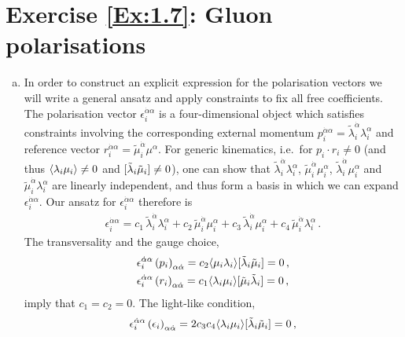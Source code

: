 
\section*{Exercise \ref{Ex:1.7}: Gluon polarisations}
\label{Sol:1.7}

\begin{enumerate}[a)]
\item In order to construct an explicit expression for the polarisation vectors we will write a general ansatz and apply constraints to fix all free coefficients. The polarisation vector $\epsilon^{\dot{\alpha}\alpha}_i$ is a four-dimensional object which satisfies constraints involving the corresponding external momentum $p_i^{\dot{\alpha} \alpha} = \tilde{\lambda}_i^{\dot{\alpha}} \lambda_i^{\alpha}$ and reference vector $r_i^{\dot{\alpha} \alpha} = \tilde{\mu}_i^{\dot{\alpha}} \mu^{\alpha}$. For generic kinematics, i.e.\ for $p_i \cdot r_i \neq 0$ (and thus $\langle \lambda_i \mu_i \rangle \neq 0$ and $[ \tilde{\lambda}_i \tilde{\mu}_i ]\neq 0$), one can show that $\tilde{\lambda}_i^{\dot{\alpha}} \lambda_i^{\alpha}$, $\tilde{\mu}_i^{\dot{\alpha}} \mu_i^{\alpha}$,
 $\tilde{\lambda}_i^{\dot{\alpha}} \mu_i^{\alpha}$ and $\tilde{\mu}_i^{\dot{\alpha}} \lambda_i^{\alpha}$ are linearly independent, and thus form a basis in which we can expand $\epsilon^{\dot{\alpha}\alpha}_i$. Our ansatz for $\epsilon^{\dot{\alpha}\alpha}_i$ therefore is
\begin{align}
\epsilon^{\dot{\alpha}\alpha}_i = c_1 \, \tilde{\lambda}_i^{\dot{\alpha}} \lambda_i^{\alpha} + c_2 \, \tilde{\mu}_i^{\dot{\alpha}} \mu_i^{\alpha} +
  c_3 \, \tilde{\lambda}_i^{\dot{\alpha}} \mu_i^{\alpha} + c_4 \, \tilde{\mu}_i^{\dot{\alpha}} \lambda_i^{\alpha} \,.
\end{align}
The transversality and the gauge choice,
\begin{align}
\begin{aligned}
& \epsilon^{\dot{\alpha}\alpha}_i \left(p_i\right)_{\alpha \dot{\alpha}} = c_2 \langle \mu_i \lambda_i \rangle [ \tilde{\lambda}_i \tilde{\mu}_i ] = 0 \,, \\
&  \epsilon^{\dot{\alpha}\alpha}_i \left(r_i\right)_{\alpha \dot{\alpha}} = c_1 \langle \lambda_i \mu_i \rangle [ \tilde{\mu}_i \tilde{\lambda}_i ] = 0 \,,
\end{aligned}
\end{align}
imply that $c_1 = c_2 = 0$. The light-like condition,
\begin{align}
\epsilon^{\dot{\alpha}\alpha}_i \left(\epsilon_i\right)_{\alpha \dot{\alpha}}= 2 c_3 c_4 \spA{\lambda_i}{\mu_i} \spB{\tilde{\lambda}_i}{\tilde{\mu}_i} = 0 \,,

\end{align}
\end{enumerate}
